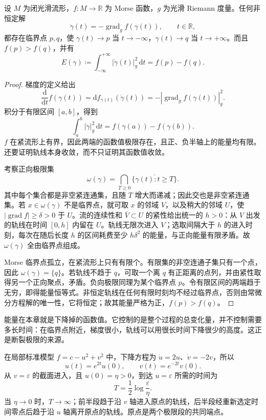 \begin{proposition}\label{g2:prop:morse-energy-limits}
	设 \(M\) 为闭光滑流形，\(f:M\to\mathbb R\) 为 Morse 函数，\(g\) 为光滑 Riemann 度量。任何非恒定解
	\[
		\dot\gamma(t)=-\operatorname{grad}_g f(\gamma(t)),\qquad t\in\mathbb R,
	\]
	都存在临界点 \(p,q\)，使 \(\gamma(t)\to p\) 当 \(t\to-\infty\)，\(\gamma(t)\to q\) 当 \(t\to+\infty\)。而且 \(f(p)>f(q)\)，并有
	\begin{equation}\label{g2:eq:morse-energy-identity}
		E(\gamma)\coloneqq\int_{-\infty}^{+\infty}|\dot\gamma(t)|_g^2\,\mathrm{d}t
		=f(p)-f(q).
	\end{equation}
\end{proposition}
\begin{proof}
	梯度的定义给出
	\[
		\frac{\mathrm{d}}{\mathrm{d}t}f(\gamma(t))
		=\mathrm{d}f_{\gamma(t)}(\dot\gamma(t))
		=-|\operatorname{grad}_g f(\gamma(t))|_g^2.
	\]
	积分于有限区间 \([a,b]\)，得到
	\[
		\int_a^b|\dot\gamma|_g^2\,\mathrm{d}t
		=f(\gamma(a))-f(\gamma(b)).
	\]
	\(f\) 在紧流形上有界，因此两端的函数值极限存在，且正、负半轴上的能量均有限。还要证明轨线本身收敛，而不只证明其函数值收敛。

	考察正向极限集
	\[
		\omega(\gamma)=\bigcap_{T\ge0}\overline{\{\gamma(t):t\ge T\}}.
	\]
	其中每个集合都是非空紧连通集，且随 \(T\) 增大而递减；因此交也是非空紧连通集。若 \(x\in\omega(\gamma)\) 不是临界点，就可取 \(x\) 的邻域 \(V\)，以及稍大的邻域 \(U\)，使 \(|\operatorname{grad}f|\ge\delta>0\) 于 \(U\)。流的连续性和 \(\overline V\subset U\) 的紧性给出统一的 \(h>0\)：从 \(V\) 出发的轨线在时间 \([0,h]\) 内留在 \(U\)。轨线无限次进入 \(V\)；选取间隔大于 \(h\) 的进入时刻，每次在随后长度 \(h\) 的区间耗费至少 \(h\delta^2\) 的能量，与正向能量有限矛盾。故 \(\omega(\gamma)\) 全由临界点组成。

	Morse 临界点孤立，在紧流形上只有有限个。有限集的非空连通子集只有一个点，因此 \(\omega(\gamma)=\{q\}\)。若轨线不趋于 \(q\)，可取一个离 \(q\) 有正距离的点列，并由紧性取得另一个正向聚点，矛盾。负向极限同理为某个临界点 \(p\)。令有限区间的两端趋于无穷，即得能量恒等式。非恒定轨线在任何有限时刻均不经过临界点，否则由常微分方程解的唯一性，它将恒定；故其能量严格为正，\(f(p)>f(q)\)。
\end{proof}

能量在本章就是下降掉的函数值。它控制的是整个过程的总变化量，并不控制需要多长时间：在临界点附近，梯度很小，轨线可以用很长时间下降很少的高度。这正是断裂极限的来源。

\begin{example}
	在局部标准模型 \(f=c-u^2+v^2\) 中，下降方程为 \(\dot u=2u\)、\(\dot v=-2v\)，所以
	\[
		u(t)=e^{2t}u(0),\qquad v(t)=e^{-2t}v(0).
	\]
	从 \(v=\varepsilon\) 的截面进入，且 \(u(0)=\eta>0\)，到达 \(u=\varepsilon\) 所需的时间为
	\[
		T=\frac12\log\frac{\varepsilon}{\eta}.
	\]
	当 \(\eta\to0\) 时，\(T\to\infty\)；前半段趋于沿 \(v\) 轴进入原点的轨线，后半段经重新选定时间零点后趋于沿 \(u\) 轴离开原点的轨线。原点是两个极限段的共同端点。
\end{example}

